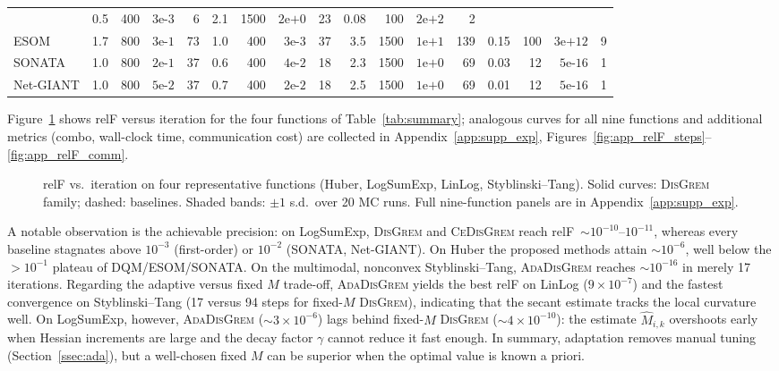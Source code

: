 \documentclass[review,onefignum,onetabnum]{siamart171218}
\begin{document}
\begin{table}[htbp]
{\begin{tabular}{l rrrr rrrr rrrr rrrr}
				& 0.5 & 400 & $3\text{e-}3$  & 6
				& 2.1 & 1500 & $2\text{e+}0$  & 23
				& 0.08 & 100 & $2\text{e+}2$  & 2 \\
				ESOM   & 1.7 & 800 & $3\text{e-}1$  & 73
				& 1.0 & 400 & $3\text{e-}3$  & 37
				& 3.5 & 1500 & $1\text{e+}1$  & 139
				& 0.15 & 100 & $3\text{e+}12$ & 9 \\
				SONATA & 1.0 & 800 & $2\text{e-}1$  & 37
				& 0.6 & 400 & $4\text{e-}2$  & 18
				& 2.3 & 1500 & $1\text{e+}0$  & 69
				& 0.03 & 12  & $5\text{e-}16$ & 1 \\
				Net-GIANT & 1.0 & 800 & $5\text{e-}2$ & 37
				& 0.7 & 400 & $2\text{e-}2$  & 18
				& 2.5 & 1500 & $1\text{e+}0$  & 69
				& 0.01 & 12  & $5\text{e-}16$ & 1 \\
				\bottomrule
		\end{tabular}}
	\end{table}
	
	Figure~\ref{fig:relF_steps_repr} shows relF versus iteration for
	the four functions of Table~\ref{tab:summary}; analogous curves
	for all nine functions and additional metrics (combo, wall-clock
	time, communication cost) are collected in
	Appendix~\ref{app:supp_exp},
	Figures~\ref{fig:app_relF_steps}--\ref{fig:app_relF_comm}.
	
	\begin{figure}[htbp]
		\centering
		\caption{relF vs.\ iteration on four representative functions
			(Huber, LogSumExp, LinLog, Styblinski--Tang).
			Solid curves: \textsc{DisGrem} family; dashed: baselines.
			Shaded bands: $\pm 1$ s.d.\ over 20 MC runs.
			Full nine-function panels are in Appendix~\ref{app:supp_exp}.}
		\label{fig:relF_steps_repr}
	\end{figure}
	
	A notable observation is the achievable precision:
	on LogSumExp, \textsc{DisGrem} and \textsc{CeDisGrem} reach
	relF~$\sim10^{-10}$--$10^{-11}$, whereas every baseline
	stagnates above $10^{-3}$ (first-order) or $10^{-2}$
	(SONATA, Net-GIANT).
	On Huber the proposed methods attain $\sim10^{-6}$, well
	below the $>10^{-1}$ plateau of DQM/ESOM/SONATA.
	On the multimodal, nonconvex Styblinski--Tang,
	\textsc{AdaDisGrem} reaches $\sim10^{-16}$ in merely 17
	iterations.
	Regarding the adaptive versus fixed $M$ trade-off,
	\textsc{AdaDisGrem} yields the best relF on LinLog
	($9{\times}10^{-7}$) and the fastest convergence on
	Styblinski--Tang (17 versus 94 steps for fixed-$M$
	\textsc{DisGrem}), indicating that the secant estimate
	tracks the local curvature well.
	On LogSumExp, however, \textsc{AdaDisGrem}
	($\sim3{\times}10^{-6}$) lags behind fixed-$M$
	\textsc{DisGrem} ($\sim4{\times}10^{-10}$):
	the estimate $\hat M_{i,k}$ overshoots early when Hessian
	increments are large and the decay factor $\gamma$ cannot
	reduce it fast enough.
	In summary, adaptation removes manual tuning
	(Section~\ref{ssec:ada}), but a well-chosen fixed $M$ can
	be superior when the optimal value is known a priori.
\end{document}

